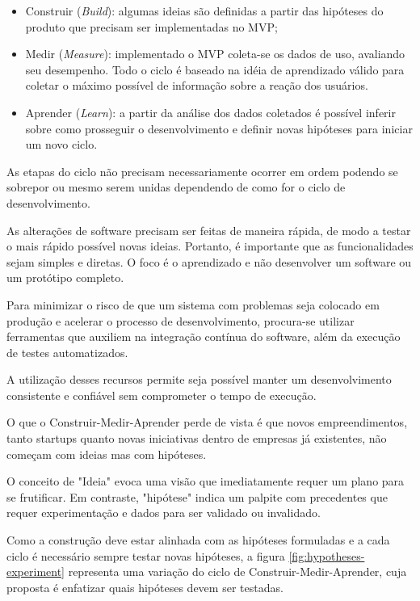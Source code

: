 \begin{itemize}
\item Construir (\emph{Build}): algumas ideias são definidas a partir das hipóteses do produto que precisam ser implementadas no MVP;
\item Medir (\emph{Measure}): implementado o MVP coleta-se os dados de uso, avaliando seu desempenho. Todo o ciclo é baseado na idéia de aprendizado válido para coletar o máximo possível de informação sobre a reação dos usuários.
\item Aprender (\emph{Learn}): a partir da análise dos dados coletados é possível inferir sobre como prosseguir o desenvolvimento e definir novas hipóteses para iniciar um novo ciclo.
\end{itemize}
\par As etapas do ciclo não precisam necessariamente ocorrer em ordem podendo se sobrepor ou mesmo serem unidas dependendo de como for o ciclo de desenvolvimento. \citep{ries:11} 
\par As alterações de software precisam ser feitas de maneira rápida, de modo a testar o mais rápido possível novas ideias. Portanto, é importante que as funcionalidades sejam simples e
 diretas. O foco é o aprendizado e não desenvolver um software ou um protótipo completo.
\par Para minimizar o risco de que um sistema com problemas seja colocado em produção e acelerar o processo de desenvolvimento, procura-se utilizar ferramentas que auxiliem na integração contínua do software, além da execução de testes automatizados. 
\par A utilização desses recursos permite seja possível manter um desenvolvimento consistente e confiável sem comprometer o tempo de execução.
\par O que o Construir-Medir-Aprender perde de vista é que novos empreendimentos, tanto startups quanto novas iniciativas dentro de empresas já existentes, não começam com ideias mas com hipóteses.  
\par O conceito de "Ideia" evoca uma visão que imediatamente requer um plano para se frutificar. Em contraste, "hipótese" indica um palpite com precedentes que requer experimentação e dados para ser validado ou invalidado. \citep{blankendeavor}  
\par Como a construção deve estar alinhada com as hipóteses formuladas e a cada ciclo é necessário sempre testar novas hipóteses, a figura \ref{fig:hypotheses-experiment} representa uma variação do ciclo de Construir-Medir-Aprender, cuja proposta é enfatizar quais hipóteses devem ser testadas.

